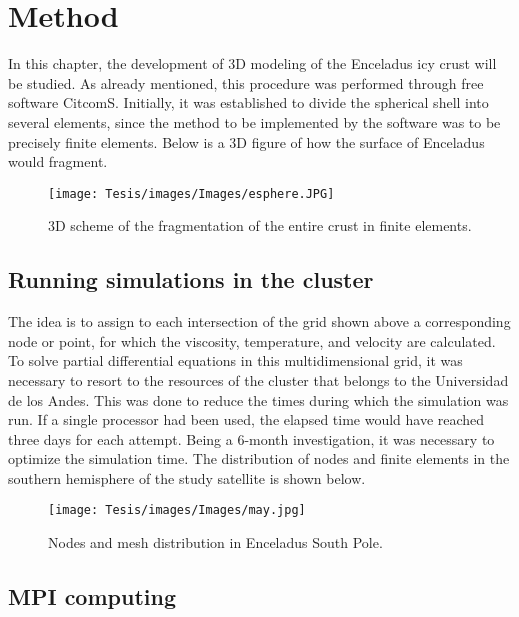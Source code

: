 \documentclass[../main.tex]{subfiles}
\begin{document}
\section{Method}

In this chapter, the development of 3D modeling of the Enceladus icy crust will be studied. As already mentioned, this procedure was performed through free software CitcomS. Initially, it was established to divide the spherical shell into several elements, since the method to be implemented by the software was to be precisely finite elements. Below is a 3D figure of how the surface of Enceladus would fragment.



\begin{figure}[h]
    \centering
    \texttt{[image: Tesis/images/Images/esphere.JPG]}
    \label{fig:my_label}
    \centering
    \caption{3D scheme of the fragmentation of the entire crust in finite elements.}
\end{figure}



\subsection{Running simulations in the cluster }

The idea is to assign to each intersection of the grid shown above a corresponding node or point, for which the viscosity, temperature, and velocity are calculated. To solve partial differential equations in this multidimensional grid, it was necessary to resort to the resources of the cluster that belongs to the Universidad de los Andes. This was done to reduce the times during which the simulation was run. If a single processor had been used, the elapsed time would have reached three days for each attempt. Being a 6-month investigation, it was necessary to optimize the simulation time. The distribution of nodes and finite elements in the southern hemisphere of the study satellite is shown below.



\begin{figure}[h]
    \centering
    \texttt{[image: Tesis/images/Images/may.jpg]}
    \label{fig:my_label}
    \centering
    \caption{Nodes and mesh distribution in Enceladus South Pole.}
\end{figure}

\subsection{MPI computing}
\end{document}
